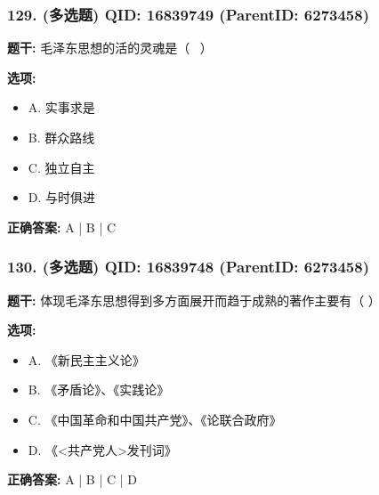 \documentclass[12pt,UTF8]{ctexart}
\begin{document}
\vspace{0.3em}\hrulefill\vspace{0.7em}

\subsubsection*{129. (多选题) \small QID: 16839749 (ParentID: 6273458)}

\textbf{题干:}
毛泽东思想的活的灵魂是（  ）



\textbf{选项:}
\begin{itemize}[leftmargin=*]

  \item A. 实事求是

  \item B. 群众路线

  \item C. 独立自主

  \item D. 与时俱进

\end{itemize}

\textbf{正确答案:}
A | B | C

\vspace{0.3em}\hrulefill\vspace{0.7em}

\subsubsection*{130. (多选题) \small QID: 16839748 (ParentID: 6273458)}

\textbf{题干:}
体现毛泽东思想得到多方面展开而趋于成熟的著作主要有（ ）



\textbf{选项:}
\begin{itemize}[leftmargin=*]

  \item A. 《新民主主义论》

  \item B. 《矛盾论》、《实践论》

  \item C. 《中国革命和中国共产党》、《论联合政府》

  \item D. 《<共产党人>发刊词》

\end{itemize}

\textbf{正确答案:}
A | B | C | D
\end{document}
